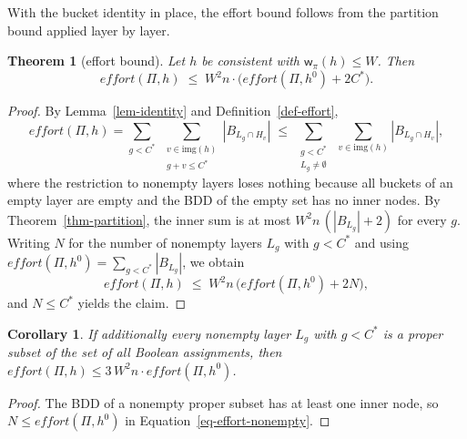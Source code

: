 \documentclass[letterpaper]{article}
\newcommand{\task}{\ensuremath{\Pi}}
\newcommand{\hblind}{\ensuremath{h^{0}}}
\newcommand{\copt}{\ensuremath{C^{*}}}
\newcommand{\bddsize}[1]{\ensuremath{|B_{#1}|}}
\newcommand{\width}{\ensuremath{\mathsf{w}}}
\newcommand{\level}[2]{\ensuremath{H_{#2}}}
\newcommand{\effort}{\ensuremath{\mathit{effort}}}
\newcommand{\img}{\ensuremath{\mathrm{img}}}
\theoremstyle{plain}
\newtheorem{theorem}{Theorem}
\newtheorem{corollary}{Corollary}
\theoremstyle{definition}
\theoremstyle{remark}
\begin{document}
With the bucket identity in place, the effort bound follows from the
partition bound applied layer by layer.

\begin{theorem}[effort bound]
\label{thm-effort}
Let $h$ be consistent with $\width_\pi(h) \leq W$. Then
\[
\effort(\task, h)
\;\leq\; W^{2} n \cdot \bigl(\effort(\task, \hblind) + 2\copt\bigr).
\]
\end{theorem}

\begin{proof}
By Lemma~\ref{lem-identity} and Definition~\ref{def-effort},
\[
\effort(\task,h)
= \sum_{g < \copt} \;\sum_{\substack{v \in \img(h)\\ g + v \leq \copt}}
\bddsize{L_g \cap \level{h}{v}}
\;\leq\; \sum_{\substack{g < \copt\\ L_g \neq \emptyset}}
\;\sum_{v \in \img(h)}
\bddsize{L_g \cap \level{h}{v}},
\]
where the restriction to nonempty layers loses nothing because all
buckets of an empty layer are empty and the BDD of the empty set has no
inner nodes. By Theorem~\ref{thm-partition}, the inner sum is at most
$W^{2} n \,(\bddsize{L_g} + 2)$ for every $g$. Writing $N$ for the
number of nonempty layers $L_g$ with $g < \copt$ and using
$\effort(\task,\hblind) = \sum_{g < \copt} \bddsize{L_g}$, we obtain
\begin{equation}
\effort(\task,h)
\;\leq\; W^{2} n \,\bigl(\effort(\task,\hblind) + 2N\bigr),
\label{eq-effort-nonempty}
\end{equation}
and $N \leq \copt$ yields the claim.
\end{proof}

\begin{corollary}
\label{cor-effort}
If additionally every nonempty layer $L_g$ with $g < \copt$ is a proper
subset of the set of all Boolean assignments, then
$\effort(\task, h) \leq 3\, W^{2} n \cdot \effort(\task, \hblind)$.
\end{corollary}

\begin{proof}
The BDD of a nonempty proper subset has at least one inner node, so
$N \leq \effort(\task,\hblind)$ in
Equation~\ref{eq-effort-nonempty}.
\end{proof}
\end{document}
